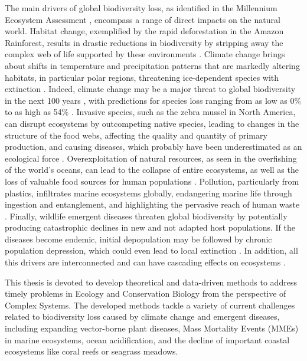 The main drivers of global biodiversity loss, as identified in the Millennium
Ecosystem Assessment \cite{finlayson2005millennium}, encompass a range of
direct impacts on the natural world. Habitat change, exemplified by the rapid
deforestation in the Amazon Rainforest, results in drastic reductions in
biodiversity by stripping away the complex web of life supported by these
environments \cite{Laurance2012}. Climate change brings about shifts in
temperature and precipitation patterns that are markedly altering habitats, in
particular polar regions, threatening ice-dependent species with extinction
\cite{Post2013}. Indeed, climate change may be a major threat to global
biodiversity in the next 100 years
\cite{Thomas2004,Loarie2009,Pimm2009,Warren2013,Warren2018}, with
predictions for species loss ranging from as low as 0\% to as high as 54\%
\cite{Urban2015}. Invasive species, such as the zebra mussel in North America,
can disrupt ecosystems by outcompeting native species, leading to changes in
the structure of the food webs, affecting the quality and quantity of primary
production, and causing diseases, which probably have been underestimated as an
ecological force \cite{Strayer2010}. Overexploitation of natural
resources, as seen in the overfishing of the world's oceans, can lead to the
collapse of entire ecosystems, as well as the loss of valuable food sources for
human populations \cite{Dayton1995,Coleman2002}. Pollution, particularly from
plastics, infiltrates marine ecosystems globally, endangering marine life
through ingestion and entanglement, and highlighting the pervasive reach of
human waste \cite{Rochman2015}. Finally, wildlife emergent diseases threaten
global biodiversity by potentially producing catastrophic declines in new and
not adapted host populations. If the diseases become endemic, initial
depopulation may be followed by chronic population depression, which could even
lead to local extinction \cite{Daszak2000}. In addition, all this drivers are
interconnected and can have cascading effects on ecosystems \cite{Mora2007}.

This thesis is devoted to develop theoretical and data-driven methods to
address timely problems in Ecology and Conservation Biology from the
perspective of Complex Systems. The developed methods tackle a variety of
current challenges related to biodiversity loss caused by climate change and
emergent diseases, including expanding vector-borne plant diseases, Mass
Mortality Events (MMEs) in marine ecosystems, ocean acidification, and
the decline of important coastal ecosystems like coral reefs or seagrass
meadows.

